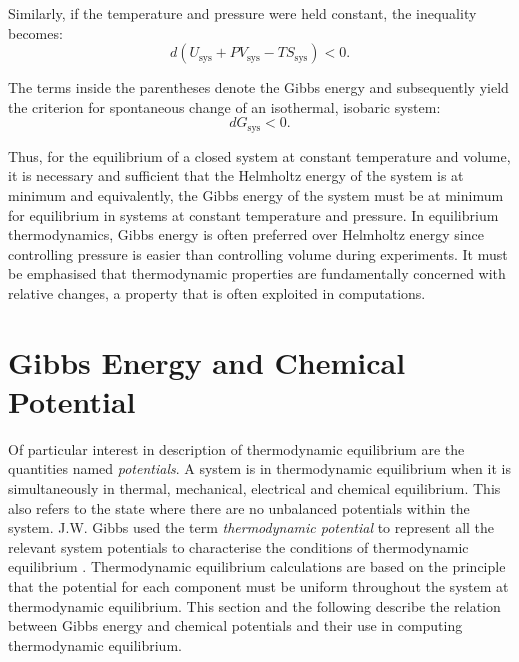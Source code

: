     Similarly, if the temperature and pressure were held constant, the inequality becomes:
    \begin{equation}
        d{\left(U_\text{sys} + PV_\text{sys} - TS_\text{sys} \right)} < 0.
    \end{equation}

    The terms inside the parentheses denote the Gibbs energy and subsequently yield the criterion for spontaneous change of an isothermal, isobaric system:
    \begin{equation}
        d{G_\text{sys} } < 0.
    \end{equation}

    Thus, for the equilibrium of a closed system at constant temperature and volume, it is necessary and sufficient that the Helmholtz energy of the system is at minimum and equivalently, the Gibbs energy of the system must be at minimum for equilibrium in systems at constant temperature and pressure. In equilibrium thermodynamics, Gibbs energy is often preferred over Helmholtz energy since controlling pressure is easier than controlling volume during experiments. It must be emphasised that thermodynamic properties are fundamentally concerned with relative changes, a property that is often exploited in computations.

\section{Gibbs Energy and Chemical Potential}
    Of particular interest in description of  thermodynamic equilibrium are the quantities named \emph{potentials}. A system is in thermodynamic equilibrium when it is simultaneously in thermal, mechanical, electrical and chemical equilibrium. This also refers to the state where there are no unbalanced potentials within the system. J.W. Gibbs used the term \emph{thermodynamic potential} to represent all the relevant system potentials to characterise the conditions of thermodynamic equilibrium \cite{Gibbs:1878aa}. Thermodynamic equilibrium calculations are based on the principle that the potential for each component must be uniform throughout the system at thermodynamic equilibrium. This section and the following describe the relation between Gibbs energy and chemical potentials and their use in computing thermodynamic equilibrium.

